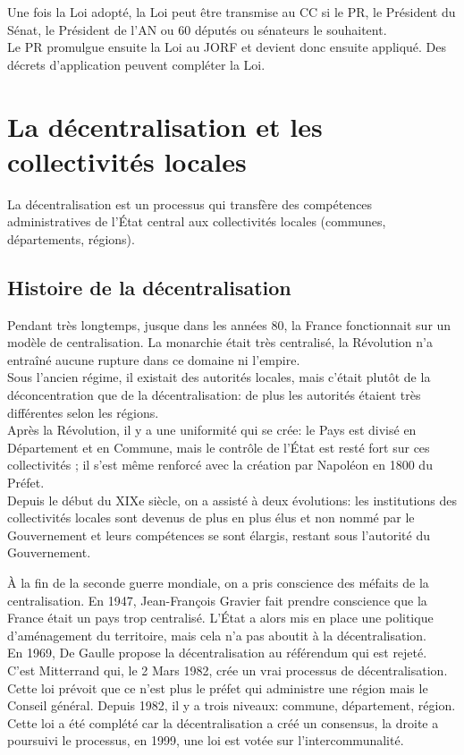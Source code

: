 \documentclass[12pt, a4paper, openany]{book}
\begin{document}
Une fois la Loi adopté, la Loi peut être transmise au CC si le PR, le Président du Sénat, le Président de l'AN ou 60 députés ou sénateurs le souhaitent. \\
Le PR promulgue ensuite la Loi au JORF et devient donc ensuite appliqué. Des décrets d'application peuvent compléter la Loi. 


\chapter{La décentralisation et les collectivités locales}

La décentralisation est un processus qui transfère des compétences administratives de l'État central aux collectivités locales (communes, départements, régions). 


\section{Histoire de la décentralisation}

Pendant très longtemps, jusque dans les années 80, la France fonctionnait sur un modèle de centralisation. La monarchie était très centralisé, la Révolution n'a entraîné aucune rupture dans ce domaine ni l'empire. \\
Sous l'ancien régime, il existait des autorités locales, mais c'était plutôt de la déconcentration que de la décentralisation: de plus les autorités étaient très différentes selon les régions. \\
Après la Révolution, il y a une uniformité qui se crée: le Pays est divisé en Département et en Commune, mais le contrôle de l'État est resté fort sur ces collectivités ; il s'est même renforcé avec la création par Napoléon en 1800 du Préfet. \\
Depuis le début du XIXe siècle, on a assisté à deux évolutions: les institutions des collectivités locales sont devenus de plus en plus élus et non nommé par le Gouvernement et leurs compétences se sont élargis, restant sous l'autorité du Gouvernement.


À la fin de la seconde guerre mondiale, on a pris conscience des méfaits de la centralisation. En 1947, Jean-François Gravier fait prendre conscience que la France était un pays trop centralisé. L'État a alors mis en place une politique d'aménagement du territoire, mais cela n'a pas aboutit à la décentralisation. \\
En 1969, De Gaulle propose la décentralisation au référendum qui est rejeté. \\
C'est Mitterrand qui, le 2 Mars 1982, crée un vrai processus de décentralisation. Cette loi prévoit que ce n'est plus le préfet qui administre une région mais le Conseil général. Depuis 1982, il y a trois niveaux: commune, département, région. \\
Cette loi a été complété car la décentralisation a créé un consensus, la droite a poursuivi le processus, en 1999, une loi est votée sur l'intercommunalité. 
\end{document}
